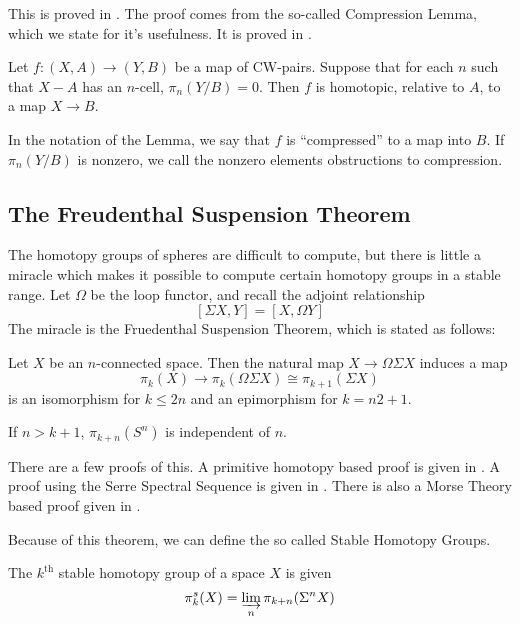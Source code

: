 This is proved in \cite[Thm~4.5]{HatcherAT}.  
The proof comes from the so-called Compression Lemma, which we state for it's usefulness.  It is proved in \cite[Thm~4.6]{HatcherAT}.

\begin{Lemma}
  Let $f:(X,A)\to (Y,B)$ be a map of CW-pairs.  Suppose that for each $n$ such that $X-A$ has an $n$-cell, $\pi_n(Y/B)=0$.  Then $f$ is homotopic, relative to $A$, to a map $X\to B$.  
\end{Lemma}

\begin{Def}
  In the notation of the Lemma, we say that $f$ is ``compressed'' to a map into $B$.  If $\pi_n(Y/B)$ is nonzero, we call the nonzero elements obstructions to compression.  
\end{Def}

\subsection{The Freudenthal Suspension Theorem}

\label{sec:Freudenthal}

The homotopy groups of spheres are difficult to compute, but there is little a miracle which makes it possible to compute certain homotopy groups in a stable range.  
Let $\Omega$ be the loop functor, and recall the adjoint relationship
\[[\Sigma X, Y]=[X, \Omega Y]\]
The miracle is the Fruedenthal Suspension Theorem, which is stated as follows:
\begin{Theorem}
  Let $X$ be an $n$-connected space.  
  Then the natural map $X\to \Omega\Sigma X$ induces a map 
  \[\pi_k(X)\to \pi_k(\Omega\Sigma X)\cong\pi_{k+1}(\Sigma X)\]
  is an isomorphism for $k\le 2n$ and an epimorphism for $k=n2+1$.  
\end{Theorem}
\begin{Cor}
  If $n>k+1$, $\pi_{k+n}(S^n)$ is independent of $n$.
\end{Cor}

There are a few proofs of this.  A primitive homotopy based proof is given in \cite[Cor~4.24]{HatcherAT}.  
A proof using the Serre Spectral Sequence is given in \cite[Ch~12]{MosherTengora}.  
There is also a Morse Theory based proof given in \cite[Cor~22.3]{MilnorMorse}.  


Because of this theorem, we can define the so called Stable Homotopy Groups.  


\begin{Def}
  The  $k^{\mbox{th}}$ stable homotopy group of a space $X$ is given
  \[\pi_k^s(X)=\varinjlim_n \pi_{k+n}(\Sigma^n X) \]
\end{Def}

